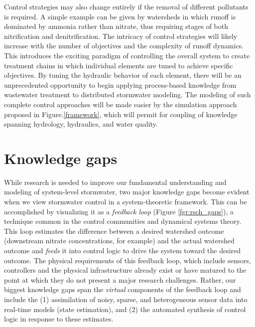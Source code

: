 Control strategies may also change entirely if the removal of different pollutants is required. 
A simple example can be given by watersheds in which runoff is dominated by ammonia rather than nitrate, thus requiring stages of both nitrification and denitrification. 
The intricacy of control strategies will likely increase with the
  number of objectives\cite{Tillinghast_2012} and the complexity of runoff dynamics. This introduces the exciting paradigm of controlling the overall system to create treatment chains in which individual elements are tuned to achieve specific objectives. 
By tuning the hydraulic behavior of each element, there will be an unprecedented opportunity to begin applying process-based knowledge from wastewater treatment to distributed stormwater modeling. 
The modeling of such complete control approaches will be made easier by the simulation approach proposed in Figure.\ref{framework}, which will permit for coupling of knowledge spanning hydrology, hydraulics, and water quality.  


\section{Knowledge gaps}
While research is needed to improve our fundamental understanding and modeling of system-level stormwater, two major knowledge gaps become evident when we view stormwater control in a system-theoretic framework. This can be accomplished by visualizing it as a \textit{feedback loop} (Figure \ref{fgr:rsch_gaps}), a technique common in the control communities and dynamical systems theory\cite{Ogata201ModernEngineering}. This loop estimates the difference between a desired watershed outcome (downstream nitrate concentrations, for example) and the actual watershed outcome and \textit{feeds} it into control logic to drive the system toward the desired outcome. The physical requirements of this feedback loop, which include sensors, controllers and the physical infrastructure already exist or have matured to the point at which they  do not present a major research challenges. Rather, our biggest knowledge gaps span the \textit{virtual} components of the feedback loop and include the (1) assimilation of noisy, sparse, and heterogeneous sensor data into real-time models (state estimation), and (2) the automated synthesis of control logic in response to these estimates. 

